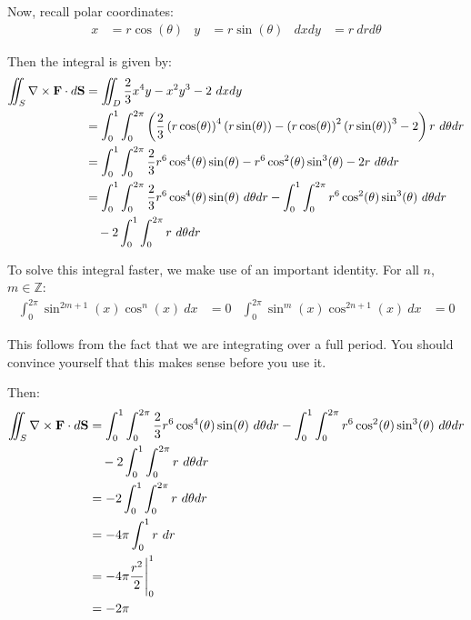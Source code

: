 \begin{solution}
    Now, recall polar coordinates:
    \begin{align}
        x &= r\cos(\theta) & y &= r\sin(\theta) & dxdy &= r \ dr d\theta
    \end{align}
    
    Then the integral is given by:
    \begin{align*}
        \iint_S \nabla \times \vb{F} \cdot d\vb{S} &= \iint_D \frac{2}{3}x^4y - x^2y^3 - 2 \ dxdy \\
        &= \int_0^1 \int_0^{2\pi} \left(\frac{2}{3}\left(r\cos(\theta)\right)^4\left(r\sin(\theta)\right) - \left(r\cos(\theta)\right)^2\left(r\sin(\theta)\right)^3 - 2\right) r \ d\theta dr \\
        &= \int_0^1 \int_0^{2\pi} \frac{2}{3}r^6\cos^4(\theta)\sin(\theta) - r^6\cos^2(\theta)\sin^3(\theta) - 2r \ d\theta dr \\
        &= \int_0^1 \int_0^{2\pi} \frac{2}{3}r^6\cos^4(\theta)\sin(\theta) \ d\theta dr - \int_0^1 \int_0^{2\pi} r^6\cos^2(\theta)\sin^3(\theta) \ d\theta dr \\
        &\quad - 2 \int_0^1 \int_0^{2\pi} r \ d\theta dr
    \end{align*}
    
    To solve this integral faster, we make use of an important identity. For all \(n\), \(m \in \mathbb{Z}\):
    \begin{align}
        \int_0^{2\pi} \sin^{2m+1}(x)\cos^n(x) \ dx &= 0 & \int_0^{2\pi} \sin^{m}(x)\cos^{2n+1}(x) \ dx &= 0
    \end{align}
    
    This follows from the fact that we are integrating over a full period. You should convince yourself that this makes sense before you use it.
    
    Then:
    \begin{align*}
        \iint_S \nabla \times \vb{F} \cdot d\vb{S} &= \int_0^1 \int_0^{2\pi} \frac{2}{3}r^6\cos^4(\theta)\sin(\theta) \ d\theta dr - \int_0^1 \int_0^{2\pi} r^6\cos^2(\theta)\sin^3(\theta) \ d\theta dr \\
        &\quad - 2 \int_0^1 \int_0^{2\pi} r \ d\theta dr \\
        &= - 2 \int_0^1 \int_0^{2\pi} r \ d\theta dr \\
        &= -4\pi \int_0^1 r \ dr \\
        &= -4\pi \frac{r^2}{2}\Biggr|_0^1 \\
        &= -2\pi 
    \end{align*}
\end{solution}

